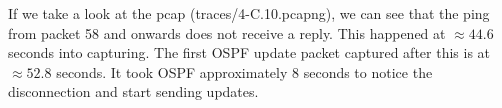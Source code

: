 If we take a look at the pcap (traces/4-C.10.pcapng), we can see that the ping from packet 58 and onwards does not receive a reply. This happened at $\approx 44.6$ seconds into capturing. The first OSPF update packet captured after this is at $\approx 52.8$ seconds. It took OSPF approximately 8 seconds to notice the disconnection and start sending updates.
